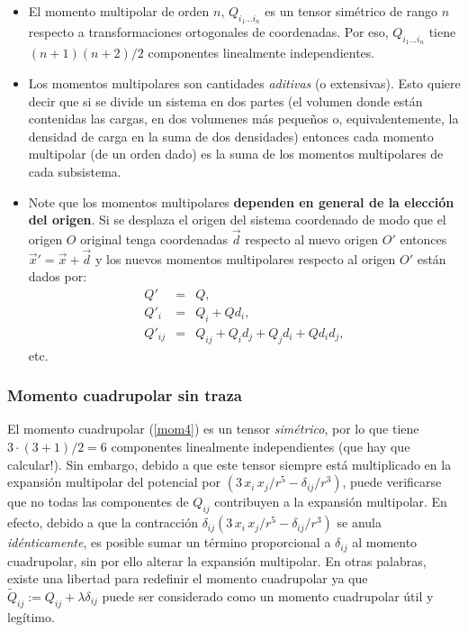\begin{itemize} 
\item El momento multipolar de orden $n$, $Q_{i_1\dots i_n}$ es un tensor simétrico de rango $n$ respecto a transformaciones ortogonales de coordenadas. Por eso, $Q_{i_1\dots i_n}$ tiene $(n+1)(n+2)/2$ componentes linealmente independientes.

\item Los momentos multipolares son cantidades \textit{aditivas} (o extensivas). Esto quiere decir que si se divide un sistema en dos partes (el volumen donde están contenidas las cargas, en dos volumenes más pequeños o, equivalentemente, la densidad de carga en la suma de dos densidades) entonces cada momento multipolar (de un orden dado) es la suma de los momentos multipolares de cada subsistema.

\item Note que los momentos multipolares \textbf{dependen en general de la
elección del origen}. Si se desplaza el origen del sistema coordenado de modo que el origen $O$ original tenga coordenadas $\vec{d}$ respecto al nuevo origen $O'$ entonces
$\vec{x}'=\vec{x}+\vec{d}$ y los nuevos momentos multipolares respecto al origen $O'$ están dados por:
\begin{eqnarray}
 Q'&=&Q,\\
Q'_i&=&Q_i+Qd_i,\\
Q'_{ij}&=&Q_{ij}+Q_id_j+Q_jd_i+Qd_id_j,
\end{eqnarray}
etc.
\end{itemize}

\subsubsection{Momento cuadrupolar sin traza}\label{MCSM}
El momento cuadrupolar (\ref{mom4}) es un tensor \textit{simétrico}, por lo
que tiene ${3\cdot (3+1)}/{2}=6$ componentes linealmente independientes (que
hay que calcular!). Sin embargo, debido a que este tensor siempre está
multiplicado en la expansión multipolar del potencial por
$\left({3\,x_i\,x_j}/{r^5}-{\delta_{ij}}/{r^3}\right)$, puede
verificarse que no todas las componentes de $Q_{ij}$ contribuyen a la
expansión multipolar. En efecto, debido a que la contracción
$\delta_{ij}\left({3\,x_i\,x_j}/{r^5}-{\delta_{ij}}/{r^3}\right)$ se
anula \textit{idénticamente}, es posible sumar un término proporcional a
$\delta_{ij}$ al momento cuadrupolar, sin por ello alterar la expansión
multipolar. En otras palabras, existe una libertad para redefinir el momento
cuadrupolar ya que $\tilde{Q}_{ij}:=Q_{ij}+\lambda\delta_{ij}$ puede ser
considerado como un momento cuadrupolar útil y legítimo. 

